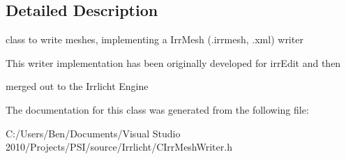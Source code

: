 \subsection{Detailed Description}
class to write meshes, implementing a Irr\-Mesh (.irrmesh, .xml) writer 

\begin{DoxyVerb}This writer implementation has been originally developed for irrEdit and then
\end{DoxyVerb}
 merged out to the Irrlicht Engine 

The documentation for this class was generated from the following file\-:\begin{DoxyCompactItemize}
\item 
C\-:/\-Users/\-Ben/\-Documents/\-Visual Studio 2010/\-Projects/\-P\-S\-I/source/\-Irrlicht/C\-Irr\-Mesh\-Writer.\-h\end{DoxyCompactItemize}
